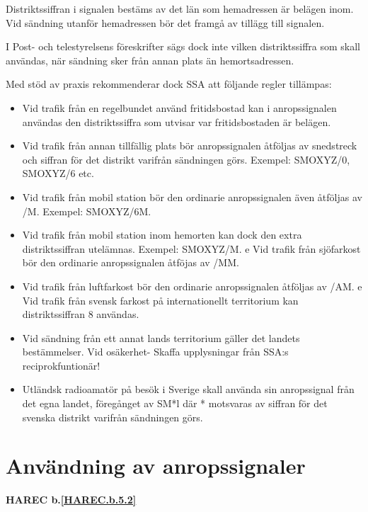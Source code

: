 Distriktssiffran i signalen bestäms av det län som hemadressen är
belägen inom. Vid sändning utanför hemadressen bör det framgå av
tillägg till signalen.


I Post- och telestyrelsens föreskrifter sägs dock inte vilken
distriktssiffra som skall användas, när sändning sker från annan plats
än hemortsadressen.

Med stöd av praxis rekommenderar dock SSA att följande regler
tillämpas:

\begin{itemize}

\item Vid trafik från en regelbundet använd fritidsbostad kan i
  anropssignalen användas den distriktssiffra som utvisar var
  fritidsbostaden är belägen.

\item Vid trafik från annan tillfällig plats bör anropssignalen
  åtföljas av snedstreck och siffran för det distrikt varifrån
  sändningen görs.  Exempel: SMOXYZ/0, SMOXYZ/6 etc.

\item Vid trafik från mobil station bör den ordinarie anropssignalen
  även åtföljas av /M.  Exempel: SMOXYZ/6M.

\item Vid trafik från mobil station inom hemorten kan dock den extra
  distriktssiffran utelämnas.  Exempel: SMOXYZ/M.  e Vid trafik från
  sjöfarkost bör den ordinarie anropssignalen åtföjas av /MM.

\item Vid trafik från luftfarkost bör den ordinarie anropssignalen
  åtföljas av /AM.  e Vid trafik från svensk farkost på
  internationellt territorium kan distriktssiffran 8 användas.

\item Vid sändning från ett annat lands territorium gäller det landets
  bestämmelser.  Vid osäkerhet- Skaffa upplysningar från SSA:s
  reciprokfuntionär!

\item Utländsk radioamatör på besök i Sverige skall använda sin
  anropssignal från det egna landet, föregånget av SM*l där *
  motsvaras av siffran för det svenska distrikt varifrån sändningen
  görs.
\end{itemize}

\section{Användning av anropssignaler}
\textbf{
HAREC b.\ref{HAREC.b.5.2}\label{myHAREC.b.5.2}
}

